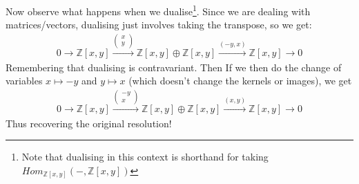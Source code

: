\documentclass[12pt]{book}
\theoremstyle{definition}
\begin{document}
Now observe what happens when we dualise\footnote{Note that dualising in this context is shorthand for taking $Hom_{\mathbb{Z}[x,y]}(- , \mathbb{Z}[x,y])$}. Since we are dealing with matrices/vectors, dualising just involves taking the transpose, so we get:
\begin{align*}
    0 \rightarrow \mathbb{Z}[x,y] \xrightarrow{\left(\begin{smallmatrix} x \\ y \end{smallmatrix}\right)} \mathbb{Z}[x,y] \oplus \mathbb{Z}[x,y] \xrightarrow{(-y,x)} \mathbb{Z}[x,y] \rightarrow 0 
\end{align*}
Remembering that dualising is contravariant. Then If we then do the change of variables $x \mapsto -y$ and $y \mapsto x$ (which doesn't change the kernels or images), we get 
\begin{align*}
    0 \rightarrow \mathbb{Z}[x,y] \xrightarrow{\left(\begin{smallmatrix} -y \\ x \end{smallmatrix}\right)} \mathbb{Z}[x,y] \oplus \mathbb{Z}[x,y] \xrightarrow{(x,y)} \mathbb{Z}[x,y] \rightarrow 0 
\end{align*}
Thus recovering the original resolution!
\end{document}
